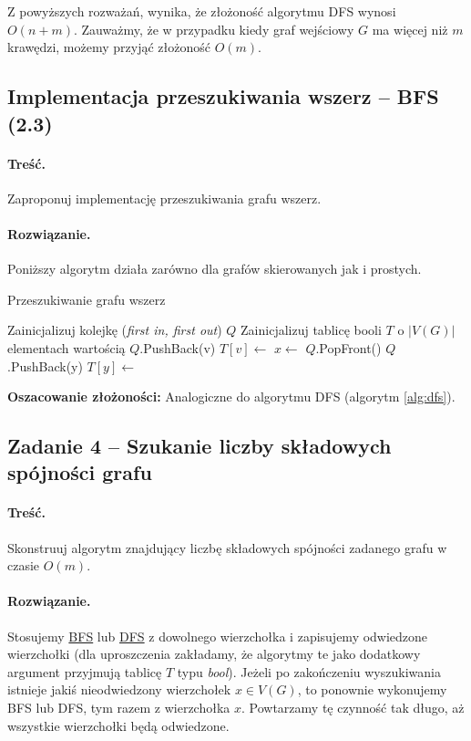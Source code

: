 Z powyższych rozważań, wynika, że złożoność algorytmu DFS wynosi $O(n + m)$. Zauważmy, że
w przypadku kiedy graf wejściowy $G$ ma więcej niż $m$ krawędzi, możemy przyjąć złożoność $O(m)$.

\subsection{Implementacja przeszukiwania wszerz -- BFS (2.3)}
\label{zad:bfs}
\paragraph{Treść.} Zaproponuj implementację
przeszukiwania grafu wszerz.
\paragraph{Rozwiązanie.}
Poniższy algorytm działa zarówno dla grafów skierowanych
jak i prostych.

\begin{algorithm}[H]
	\caption{Przeszukiwanie grafu wszerz}\label{Zadanie23}
	\begin{algorithmic}[1]
		\State Zainicjalizuj kolejkę (\textit{first in, first out}) $Q$
		\State Zainicjalizuj tablicę booli $T$ o $|V(G)|$ elementach wartością 
		\false
		\State $Q$.PushBack(v)
		\State $T[v] \gets$ \false
		\State $x \gets$ $Q$.PopFront()
		\State $Q$.PushBack(y)
		\State $T[y] \gets$ \true
		\EndIf
		\EndWhile
		\EndWhile
		\EndProcedure
	\end{algorithmic}
\end{algorithm}

\textbf{Oszacowanie złożoności:} Analogiczne do algorytmu DFS (algorytm \ref{alg:dfs}).


\subsection{Zadanie 4 -- Szukanie liczby składowych spójności grafu}
\paragraph{Treść.} Skonstruuj algorytm znajdujący liczbę składowych 
spójności zadanego grafu w czasie $O(m)$.

\paragraph{Rozwiązanie.} Stosujemy \hyperref[Zadanie23]{BFS} lub \hyperref[Zadanie22a]{DFS} z dowolnego wierzchołka i zapisujemy odwiedzone wierzchołki (dla uproszczenia zakładamy, że algorytmy te jako dodatkowy argument przyjmują tablicę $T$ typu \textit{bool}). Jeżeli po zakończeniu wyszukiwania istnieje jakiś nieodwiedzony wierzchołek $x \in V(G)$, to ponownie wykonujemy BFS lub DFS, tym razem z wierzchołka $x$. Powtarzamy tę czynność tak długo, aż wszystkie wierzchołki będą odwiedzone. 



